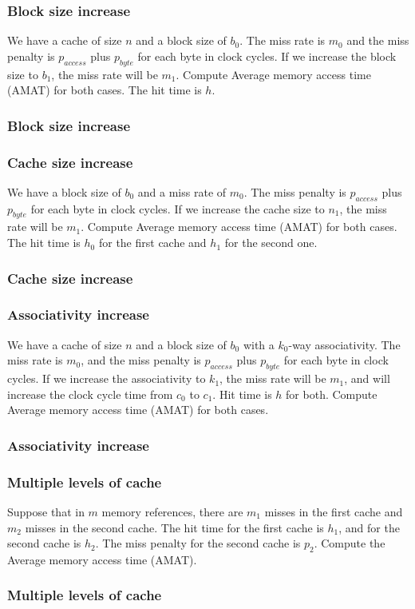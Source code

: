 \begin{frame}
    \frametitle{Block size increase}
    We have a cache of size $n$ and a block size of $b_{0}$.
    The miss rate is $m_{0}$ and the miss penalty is $p_{access}$ plus $p_{byte}$
    for each byte in clock cycles. If we increase the block size to $b_{1}$,
    the miss rate will be $m_{1}$. Compute Average memory access time (AMAT)
    for both cases. The hit time is $h$.
\end{frame}
\begin{frame}
    \frametitle{Block size increase}
\end{frame}


\begin{frame}
    \frametitle{Cache size increase}
    We have a block size of $b_{0}$ and a miss rate of $m_{0}$.
    The miss penalty is $p_{access}$ plus $p_{byte}$ for each byte in clock cycles.
    If we increase the cache size to $n_{1}$, the miss rate will be $m_{1}$.
    Compute Average memory access time (AMAT) for both cases.
    The hit time is $h_{0}$ for the first cache and $h_{1}$ for the second one.
\end{frame}
\begin{frame}
    \frametitle{Cache size increase}
\end{frame}

\begin{frame}
    \frametitle{Associativity increase}
    We have a cache of size $n$ and a block size of $b_{0}$ with a $k_{0}$-way associativity.
    The miss rate is $m_{0}$, and the miss penalty is $p_{access}$ plus $p_{byte}$ for
    each byte in clock cycles. If we increase the associativity to $k_{1}$,
    the miss rate will be $m_{1}$, and will increase the clock cycle time from $c_{0}$ to $c_{1}$.
    Hit time is $h$ for both. Compute Average memory access time (AMAT) for both cases.
\end{frame}
\begin{frame}
    \frametitle{Associativity increase}
\end{frame}

\begin{frame}
    \frametitle{Multiple levels of cache}
    Suppose that in $m$ memory references, there are $m_{1}$ misses in the first cache and $m_{2}$ misses in the second cache.
    The hit time for the first cache is $h_{1}$, and for the second cache is $h_{2}$.
    The miss penalty for the second cache is $p_{2}$.
    Compute the Average memory access time (AMAT).
\end{frame}
\begin{frame}
    \frametitle{Multiple levels of cache}
\end{frame}